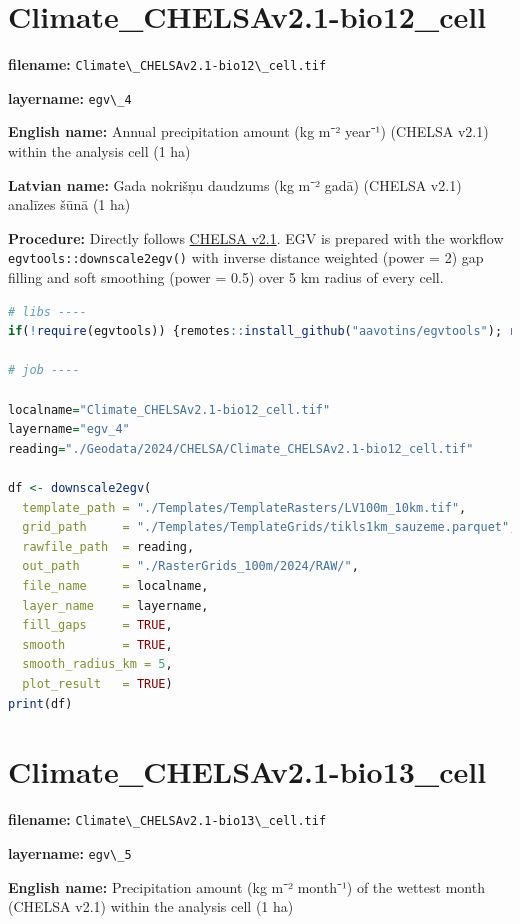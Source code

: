 \documentclass[
]{book}
\newcommand{\passthrough}[1]{#1}
\begin{document}
\section{Climate\_CHELSAv2.1-bio12\_cell}\label{ch06.004}

\textbf{filename:} \passthrough{\lstinline!Climate\_CHELSAv2.1-bio12\_cell.tif!}

\textbf{layername:} \passthrough{\lstinline!egv\_4!}

\textbf{English name:} Annual precipitation amount (kg m⁻² year⁻¹) (CHELSA v2.1) within the analysis cell (1 ha)

\textbf{Latvian name:} Gada nokrišņu daudzums (kg m⁻² gadā) (CHELSA v2.1) analīzes šūnā (1 ha)

\textbf{Procedure:} Directly follows \hyperref[Ch04.11]{CHELSA v2.1}. EGV is prepared with the
workflow \passthrough{\lstinline!egvtools::downscale2egv()!} with inverse distance weighted (power = 2)
gap filling and soft smoothing (power = 0.5) over 5 km radius of every cell.

\begin{lstlisting}[language=R]
# libs ----
if(!require(egvtools)) {remotes::install_github("aavotins/egvtools"); require(egvtools)}

# job ----

localname="Climate_CHELSAv2.1-bio12_cell.tif"
layername="egv_4"
reading="./Geodata/2024/CHELSA/Climate_CHELSAv2.1-bio12_cell.tif"

df <- downscale2egv(
  template_path = "./Templates/TemplateRasters/LV100m_10km.tif",
  grid_path     = "./Templates/TemplateGrids/tikls1km_sauzeme.parquet",
  rawfile_path  = reading,
  out_path      = "./RasterGrids_100m/2024/RAW/",
  file_name     = localname,
  layer_name    = layername,
  fill_gaps     = TRUE,
  smooth        = TRUE,
  smooth_radius_km = 5,
  plot_result   = TRUE)
print(df)
\end{lstlisting}

\section{Climate\_CHELSAv2.1-bio13\_cell}\label{ch06.005}

\textbf{filename:} \passthrough{\lstinline!Climate\_CHELSAv2.1-bio13\_cell.tif!}

\textbf{layername:} \passthrough{\lstinline!egv\_5!}

\textbf{English name:} Precipitation amount (kg m⁻² month⁻¹) of the wettest month (CHELSA v2.1) within the analysis cell (1 ha)
\end{document}
